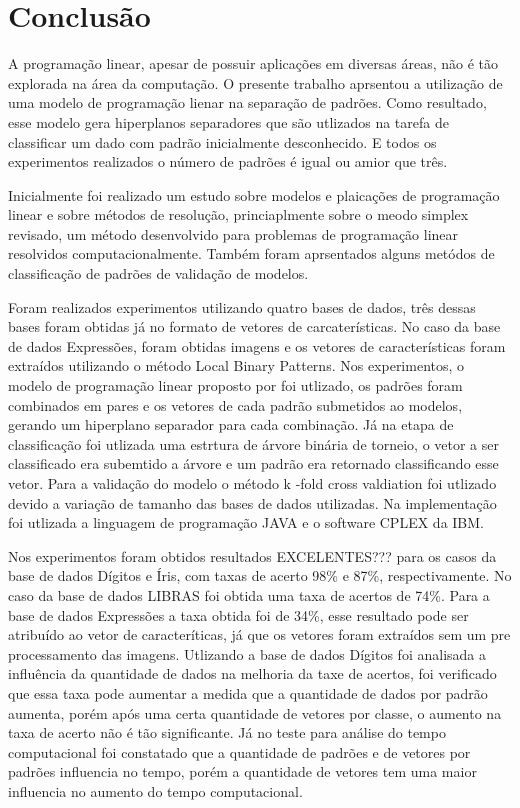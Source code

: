 \chapter{Conclusão}

A programação linear, apesar de possuir aplicações em diversas áreas, não é tão explorada na área da computação. O presente trabalho aprsentou a utilização de uma modelo de programação lienar na separação de padrões. Como resultado, esse modelo gera hiperplanos separadores que são utlizados na tarefa de classificar um dado com padrão inicialmente desconhecido. E todos os experimentos realizados o número de padrões é igual ou amior que três.

Inicialmente foi realizado um estudo sobre modelos e plaicações de programação linear e sobre métodos de resolução, princiaplmente sobre o meodo simplex revisado, um método desenvolvido para problemas de programação linear resolvidos computacionalmente. Também foram aprsentados alguns metódos de classificação de padrões de validação de modelos.

Foram realizados experimentos utilizando quatro bases de dados, três dessas bases foram obtidas já no formato de vetores de carcaterísticas. No caso da base de dados Expressões, foram obtidas imagens e os vetores de características foram extraídos utilizando o método Local Binary Patterns. Nos experimentos, o modelo de programação linear proposto por  foi utlizado, os padrões foram combinados em pares e os vetores de cada padrão submetidos ao modelos, gerando um hiperplano separador para cada combinação. Já na etapa de classificação foi utlizada uma estrtura de árvore binária de torneio, o vetor a ser classificado era subemtido a árvore e um padrão era retornado classificando esse vetor. Para a validação do modelo o método k -fold cross valdiation foi utlizado devido a variação de tamanho das bases de dados utilizadas. Na implementação foi utlizada a linguagem de programação JAVA e o software CPLEX da IBM.

Nos experimentos foram obtidos resultados EXCELENTES??? para os casos da base de dados Dígitos e Íris, com taxas de acerto 98\% e 87\%, respectivamente. No caso da base de dados LIBRAS foi obtida uma taxa de acertos de 74\%. Para a base de dados Expressões a taxa obtida foi de 34\%, esse resultado pode ser atribuído ao vetor de caracteríticas, já que os vetores foram extraídos sem um pre processamento das imagens. Utlizando a base de dados Dígitos foi analisada a influência da quantidade de dados na melhoria da taxe de acertos, foi verificado que essa taxa pode aumentar a medida que a quantidade de dados por padrão aumenta, porém após uma certa quantidade de vetores por classe, o aumento na taxa de acerto não é tão significante. Já no teste para análise do tempo computacional foi constatado que a quantidade de padrões e de vetores por padrões influencia no tempo, porém a quantidade de vetores tem uma maior influencia no aumento do tempo computacional.

